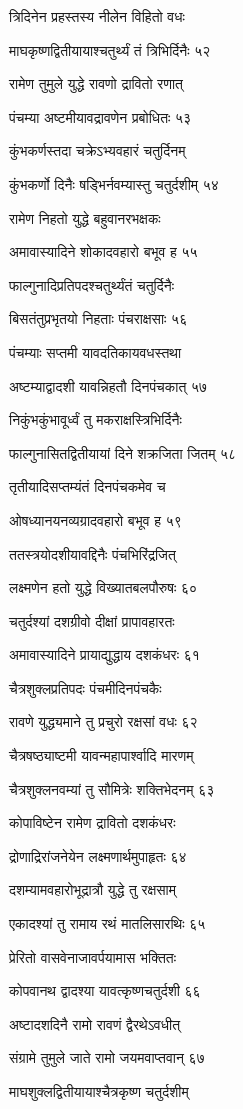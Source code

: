 त्रिदिनेन प्रहस्तस्य नीलेन विहितो वधः

माघकृष्णद्वितीयायाश्चतुर्थ्यं तं त्रिभिर्दिनैः ५२

रामेण तुमुले युद्धे रावणो द्रावितो रणात्

पंचम्या अष्टमीयावद्रावणेन प्रबोधितः ५३

कुंभकर्णस्तदा चक्रेऽभ्यवहारं चतुर्दिनम्

कुंभकर्णो दिनैः षड्भिर्नवम्यास्तु चतुर्दशीम् ५४

रामेण निहतो युद्धे बहुवानरभक्षकः

अमावास्यादिने शोकादवहारो बभूव ह ५५

फाल्गुनादिप्रतिपदश्चतुर्थ्यंतं चतुर्दिनैः

बिसतंतुप्रभृतयो निहताः पंचराक्षसाः ५६

पंचम्याः सप्तमी यावदतिकायवधस्तथा

अष्टम्याद्वादशी यावन्निहतौ दिनपंचकात् ५७

निकुंभकुंभावूर्ध्वं तु मकराक्षस्त्रिभिर्दिनैः

फाल्गुनासितद्वितीयायां दिने शक्रजिता जितम् ५८

तृतीयादिसप्तम्यंतं दिनपंचकमेव च

ओषध्यानयनव्यग्रादवहारो बभूव ह ५९

ततस्त्रयोदशीयावद्दिनैः पंचभिरिंद्रजित्

लक्ष्मणेन हतो युद्धे विख्यातबलपौरुषः ६०

चतुर्दश्यां दशग्रीवो दीक्षां प्रापावहारतः

अमावास्यादिने प्रायाद्युद्धाय दशकंधरः ६१

चैत्रशुक्लप्रतिपदः पंचमीदिनपंचकैः

रावणे युद्ध्यमाने तु प्रचुरो रक्षसां वधः ६२

चैत्रषष्ठ्याष्टमी यावन्महापार्श्वादि मारणम्

चैत्रशुक्लनवम्यां तु सौमित्रेः शक्तिभेदनम् ६३

कोपाविष्टेन रामेण द्रावितो दशकंधरः

द्रोणाद्रिरांजनेयेन लक्ष्मणार्थमुपाहृतः ६४

दशम्यामवहारोभूद्रात्रौ युद्धे तु रक्षसाम्

एकादश्यां तु रामाय रथं मातलिसारथिः ६५

प्रेरितो वासवेनाजावर्पयामास भक्तितः

कोपवानथ द्वादश्या यावत्कृष्णचतुर्दशी ६६

अष्टादशदिनै रामो रावणं द्वैरथेऽवधीत्

संग्रामे तुमुले जाते रामो जयमवाप्तवान् ६७

माघशुक्लद्वितीयायाश्चैत्रकृष्ण चतुर्दशीम्

